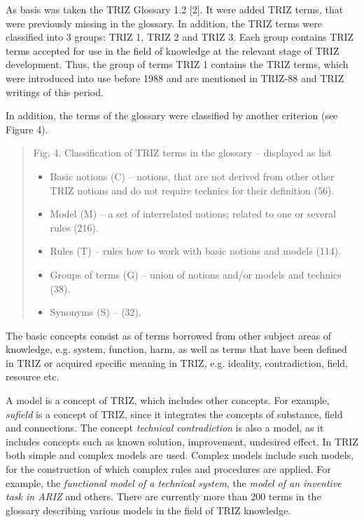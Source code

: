 \documentclass[11pt,a4paper]{article}
\begin{document}
As basis was taken the TRIZ Glossary 1.2 [2]. It were added TRIZ terms, that
were previously missing in the glossary. In addition, the TRIZ terms were
classified into 3 groups: TRIZ 1, TRIZ 2 and TRIZ 3. Each group contains TRIZ
terms accepted for use in the field of knowledge at the relevant stage of TRIZ
development. Thus, the group of terms TRIZ 1 contains the TRIZ terms, which
were introduced into use before 1988 and are mentioned in TRIZ-88 and TRIZ
writings of this period.

In addition, the terms of the glossary were classified by another criterion
(see Figure 4).

\begin{quote}
  Fig. 4. Classification of TRIZ terms in the glossary -- displayed as list

  \begin{itemize}[noitemsep]
  \item Basic notions (C) -- notions, that are not derived from other other
    TRIZ notions and do not require technics for their definition (56).
  \item Model (M) -- a set of interrelated notions; related to one or several
    rules (216).
  \item Rules (T) -- rules how to work with basic notions and models (114). 
  \item Groups of terms (G) -- union of notions and/or models and technics
    (38). 
  \item Synonyms (S) -- (32).
  \end{itemize}
\end{quote}

The basic concepts consist as of terms borrowed from other subject areas of
knowledge, e.g. system, function, harm, as well as terms that have been
defined in TRIZ or acquired specific meaning in TRIZ, e.g. ideality,
contradiction, field, resource etc.

A model is a concept of TRIZ, which includes other concepts. For example,
\emph{sufield} is a concept of TRIZ, since it integrates the concepts of
substance, field and connections.  The concept \emph{technical contradiction}
is also a model, as it includes concepts such as known solution, improvement,
undesired effect. In TRIZ both simple and complex models are used. Complex
models include such models, for the construction of which complex rules and
procedures are applied.  For example, the \emph{functional model of a
  technical system}, the \emph{model of an inventive task in ARIZ} and others.
There are currently more than 200 terms in the glossary describing various
models in the field of TRIZ knowledge.
\end{document}
